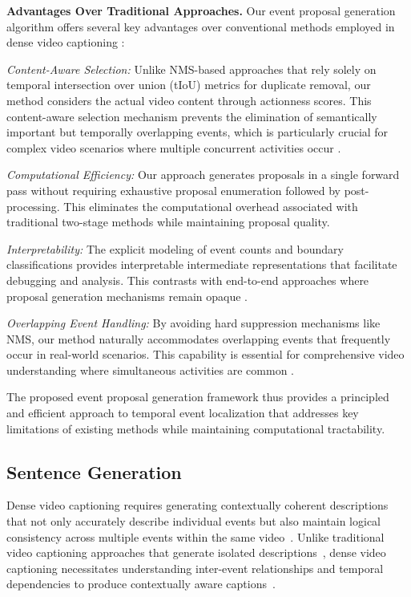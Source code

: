 \textbf{Advantages Over Traditional Approaches.}
Our event proposal generation algorithm offers several key advantages over conventional methods employed in dense video captioning \cite{Krishna2017-pw, Li2018-ll, Wang2018-ap}:

\textit{Content-Aware Selection:} Unlike NMS-based approaches \cite{hosang2017learning} that rely solely on temporal intersection over union (tIoU) metrics for duplicate removal, our method considers the actual video content through actionness scores.
This content-aware selection mechanism prevents the elimination of semantically important but temporally overlapping events, which is particularly crucial for complex video scenarios where multiple concurrent activities occur \cite{Mun2019-ap}.

\textit{Computational Efficiency:} Our approach generates proposals in a single forward pass without requiring exhaustive proposal enumeration followed by post-processing. This eliminates the computational overhead associated with traditional two-stage methods \cite{buch2017sst, lin2018bsn} while maintaining proposal quality.

\textit{Interpretability:} The explicit modeling of event counts and boundary classifications provides interpretable intermediate representations that facilitate debugging and analysis. This contrasts with end-to-end approaches where proposal generation mechanisms remain opaque \cite{Zhou2018-zu}.

\textit{Overlapping Event Handling:} By avoiding hard suppression mechanisms like NMS, our method naturally accommodates overlapping events that frequently occur in real-world scenarios. This capability is essential for comprehensive video understanding where simultaneous activities are common \cite{Duan2018-qf}.

The proposed event proposal generation framework thus provides a principled and efficient approach to temporal event localization that addresses key limitations of existing methods while maintaining computational tractability.

\subsection{Sentence Generation}
Dense video captioning requires generating contextually coherent descriptions that not only accurately describe individual events but also maintain logical consistency across multiple events within the same video~\cite{Krishna2017-pw}. Unlike traditional video captioning approaches that generate isolated descriptions~\cite{venugopalan2015sequence,venugopalan2015translating}, dense video captioning necessitates understanding inter-event relationships and temporal dependencies to produce contextually aware captions~\cite{yu2016video,lei2020mart}.

